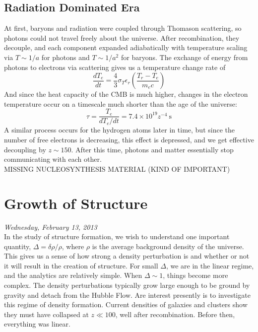 \documentclass[10pt]{article}
\numberwithin{equation}{section}
\newcommand{\n}{\noindent}
\begin{document}
	\subsection{Radiation Dominated Era} %
	\label{sub:radiation_dominated_era}
	At first, baryons and radiation were coupled through Thomason scattering, so photons could not travel freely about the universe. After recombination, they decouple, and each component expanded adiabatically with temperature scaling via $T\sim 1/a$ for photons and $T\sim 1/a^2$ for baryons. The exchange of energy from photons to electrons via scattering gives us a temperature change rate of
	\begin{equation}
		\label{eq:radiation:1} \frac{dT_e}{dt} = \frac{4}{3}\sigma_T\epsilon_r\left(\frac{T_r-T_e}{m_ec}\right)
	\end{equation}
	And since the heat capacity of the CMB is much higher, changes in the electron temperature occur on a timescale much shorter than the age of the universe:
	\begin{equation}
		\label{eq:radiation:2} \tau = \frac{T_e}{dT_e/dt} = 7.4\times 10^{19}z^{-4}\ \mathrm{s}
	\end{equation}
	A similar process occurs for the hydrogen atoms later in time, but since the number of free electrons is decreasing, this effect is depressed, and we get effective decoupling by $z\sim 150$. After this time, photons and matter essentially stop communicating with each other.\\

\n MISSING NUCLEOSYNTHESIS MATERIAL (KIND OF IMPORTANT)
\section{Growth of Structure} %
\label{sec:growth_of_structure}
	\textit{Wednesday, February 13, 2013}\\
	
	\n In the study of structure formation, we wish to understand one important quantity, $\Delta = \delta\rho/\rho$, where $\rho$ is the average background density of the universe. This gives us a sense of how strong a density perturbation is and whether or not it will result in the creation of structure. For small $\Delta$, we are in the linear regime, and the analytics are relatively simple. When $\Delta\sim 1$, things become more complex. The density perturbations typically grow large enough to be ground by gravity and detach from the Hubble Flow. Are interest presently is to investigate this regime of density formation. Current densities of galaxies and clusters show they must have collapsed at $z\ll 100$, well after recombination. Before then, everything was linear.\\
	
\end{document}
